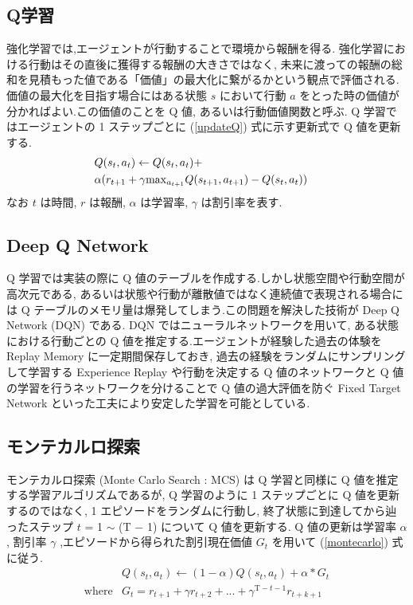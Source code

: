 \documentclass[twocolumn]{jarticle}
\begin{document}
\subsection{Q学習}
強化学習では,エージェントが行動することで環境から報酬を得る. 強化学習における行動はその直後に獲得する報酬の大きさではなく, 未来に渡っての報酬の総和を見積もった値である「価値」の最大化に繋がるかという観点で評価される.
価値の最大化を目指す場合にはある状態 $s$ において行動 $a$ をとった時の価値が分かればよい.この価値のことを Q 値, あるいは行動価値関数と呼ぶ.
 Q 学習ではエージェントの 1 ステップごとに (\ref{updateQ}) 式に示す更新式で Q 値を更新する.
\begin{eqnarray}
  \label{updateQ}
  \lefteqn{Q(s_t,a_t) \leftarrow Q(s_t,a_t) + } \nonumber \\
   &\alpha(r_{t+1} + \gamma \mathrm{max}_{a_{t+1}}Q(s_{t+1},a_{t+1}) - Q(s_t,a_t))& 
\end{eqnarray}
なお $t$ は時間, $r$ は報酬, $\alpha$ は学習率, $\gamma$ は割引率を表す.

\subsection{Deep Q Network}
Q 学習では実装の際に Q 値のテーブルを作成する.しかし状態空間や行動空間が高次元である, あるいは状態や行動が離散値ではなく連続値で表現される場合には Q テーブルのメモリ量は爆発してしまう.この問題を解決した技術が Deep Q Network (DQN) \cite{DQN} である.
 DQN ではニューラルネットワークを用いて, ある状態における行動ごとの Q 値を推定する.エージェントが経験した過去の体験を Replay Memory に一定期間保存しておき, 過去の経験をランダムにサンプリングして学習する Experience Replay や行動を決定する Q 値のネットワークと Q 値の学習を行うネットワークを分けることで Q 値の過大評価を防ぐ Fixed Target Network といった工夫により安定した学習を可能としている.

\subsection{モンテカルロ探索}
モンテカルロ探索 (Monte Carlo Search : MCS) は Q 学習と同様に Q 値を推定する学習アルゴリズムであるが, Q 学習のように 1 ステップごとに Q 値を更新するのではなく, 1 エピソードをランダムに行動し, 終了状態に到達してから辿ったステップ $t$ = 1 $\sim$ (T $-$ 1) について Q 値を更新する. Q 値の更新は学習率 $\alpha$ , 割引率 $\gamma$ ,エピソードから得られた割引現在価値 $G_t$ を用いて (\ref{montecarlo}) 式に従う.
\begin{eqnarray}
  \label{montecarlo}
  &Q(s_t,a_t) \leftarrow (1 - \alpha)Q(s_t,a_t) + \alpha * G_{t} \\
  \mathrm{where}  &G_t = r_{t+1} + \gamma r_{t+2} + ... + \gamma^{\mathrm{T}-t-1} r_{t+k+1} \nonumber
\end{eqnarray}
\end{document}
